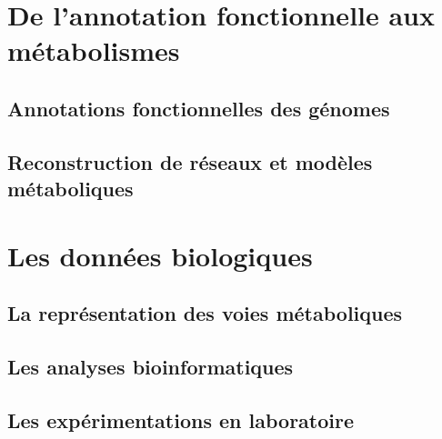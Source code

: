 \chapter{De l'annotation fonctionnelle aux métabolismes}
\section{Annotations fonctionnelles des génomes}
\section{Reconstruction de réseaux et modèles métaboliques}
\chapter{Les données biologiques}
\section{La représentation des voies métaboliques}
\section{Les analyses bioinformatiques}
\section{Les expérimentations en laboratoire}